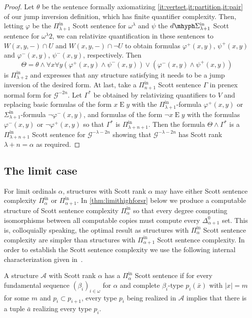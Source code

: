 \documentclass{amsart}
\newcommand\+[1]{\mathcal{#1}}
\renewcommand\*[1]{\mathbf{#1}}
\renewcommand\=[1]{\text{#1}}
\renewcommand\*[1]{\mathbf{#1}}
\renewcommand{\phi}{\varphi}
\newcommand{\Pinf}[1]{\Pi^{\mathrm{in}}_{#1}}
\newcommand{\Sinf}[1]{\Sigma^{\mathrm{in}}_{#1}}
\newcommand{\dSinf}[1]{d\mhyph\Sigma^{\mathrm{in}}_{#1}}
\newcommand{\nat}{\omega}
\begin{document}
\begin{proof}
  Let $\theta$ be the sentence formally axiomatizing \cref{it:vertset,it:partition,it:pair} of our jump inversion definition, which has finite quantifier complexity. Then, letting $\phi$ be the $\Pinf{\lambda+1}$ Scott sentence for $\omega^\lambda$ and $\psi$ the $\dSinf{\lambda+1}$ Scott sentence for $\omega^\lambda2$, we can relativize quantification in these sentences to $W(x,y,-)\cap U$ and $W(x,y,-)\cap \neg U$ to obtain formulas $\phi^+(x,y)$, $\psi^+(x,y)$ and $\phi^-(x,y)$, $\psi^-(x,y)$, respectively. Then
  \[ \Theta=\theta\land  \forall x\forall y (\phi^+(x,y) \land \psi^-(x,y)) \lor (\phi^-(x,y)\land \psi^+(x,y))\]
  is $\Pinf{\lambda+2}$ and expresses that any structure satisfying it needs to be a jump inversion of the desired form. At last, take a $\Pinf{n+1}$ Scott sentence $\Gamma$ in prenex normal form for $\+G^{-2n}$. Let $\Gamma^*$ be obtained by relativizing quantifiers to $V$ and replacing basic formulas of the form $x\mathrel{E}y$ with the $\Pinf{\lambda+1}$-formula $\phi^+(x,y)$ or $\Sinf{\lambda+1}$-formula $\neg \phi^-(x,y)$, and formulas of the form $\neg x\mathrel{E}y$ with the formulas $\phi^-(x,y)$ or $\neg\phi^+(x,y)$ so that $\Gamma^*$ is $\Pinf{\lambda+n+1}$. Then the formula $\Theta\land \Gamma^*$ is a $\Pinf{\lambda+n+1}$ Scott sentence for $\+G^{-\lambda-2n}$ showing that $\+G^{-\lambda-2n}$ has Scott rank $\lambda+n=\alpha$ as required.
 \end{proof}
 \subsection{The limit case}
 For limit ordinals $\alpha$, structures with Scott rank $\alpha$ may have either Scott sentence complexity $\Pinf{\alpha}$ or $\Pinf{\alpha+1}$. In \cref{thm:limithighforsr} below we produce a computable structure of Scott sentence complexity $\Pinf{\alpha}$ so that every degree computing isomorphisms between all computable copies must compute every $\Delta^0_{\alpha+1}$ set. This is, colloquially speaking, the optimal result as structures with $\Pinf{\alpha}$ Scott sentence complexity are simpler than structures with $\Pinf{\alpha+1}$ Scott sentence complexity. In order to establish the Scott sentence complexity we use the following internal characterization given in~\cite{gonzalez2024}.
 \begin{lemma}\label{lem:unstableseq}
   A structure $\+A$ with Scott rank $\alpha$ has a $\Pinf{\alpha}$ Scott sentence if for every fundamental sequence $(\beta_i)_{i\in\nat}$ for $\alpha$ and complete $\beta_i$-type $p_i(\bar x)$ with $|x|=m$ for some $m$ and $p_i\subset p_{i+1}$, every type $p_i$ being realized in $\+A$ implies that there is a tuple $\bar a$ realizing every type $p_i$.
 \end{lemma}
\end{document}
